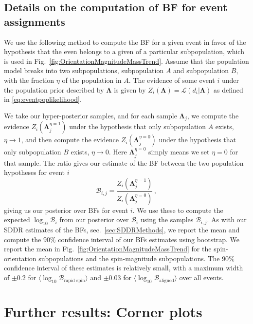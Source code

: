 \documentclass[twocolumn,usenames,dvipsnames,linenumbers]{aastex631}
\begin{document}
\subsection{Details on the computation of BF for event assignments}
\label{sec:Appxeventassignments}
We use the following method to compute the \ac{BF} for a given event in favor of the hypothesis that the even belongs to a given of a particular subpopulation, which is used in Fig.~\ref{fig:OrientationMagnitudeMassTrend}.
Assume that the population model breaks into two subpopulations, subpopulation $A$ and subpopulation $B$, with the fraction $\eta$ of the population in $A$. 
The evidence of some event $i$ under the population prior described by $\boldsymbol{\Lambda}$ is given by $Z_i(\boldsymbol{\Lambda}) = \mathcal{L}(d_i | \boldsymbol{\Lambda})$ as defined in \eqref{eq:eventpoplikelihood}. 

We take our hyper-posterior samples, and for each  sample $
\boldsymbol{\Lambda}_j$, we compute the evidence $Z_i(\boldsymbol{\Lambda}_j^{\eta = 1})$ under the hypothesis that only subpopulation $A$ exists, $\eta \to 1$, and then compute the evidence $Z_i(\boldsymbol{\Lambda}_j^{\eta = 0})$ under the hypothesis that only subpopulation $B$ exists, $\eta \to 0$. 
Here $\boldsymbol{\Lambda}_j^{\eta = 0}$ simply means we set $\eta = 0$ for that sample.
The ratio gives our estimate of the \ac{BF} between the two population hypotheses for event $i$
\begin{equation}
	\mathcal{B}_{i,j} = \frac{Z_i(\boldsymbol{\Lambda}_j^{\eta = 1})}{Z_i(\boldsymbol{\Lambda}_j^{\eta = 0})}\,,
\end{equation} 
giving us our posterior over \acp{BF} for event $i$. 
We use these to compute the expected $\log_{10}\mathcal B_i$ from our posterior over $\mathcal{B}_i$ using the samples $\mathcal B_{i,j}$.
As with our SDDR estimates of the \acp{BF}, sec.~\ref{sec:SDDRMethods}, we report the mean and compute the $90\%$ confidence interval of our \acp{BF} estimates using bootstrap.
 We report the mean  in Fig.~\ref{fig:OrientationMagnitudeMassTrend} for the spin-orientation subpopulations and the spin-magnitude subpopulations.
 The $90\%$ confidence interval of these estimates is relatively small, with a maximum width of $\pm 0.2$ for $\langle \log_{10}\mathcal B_{\text{rapid spin}}\rangle$ and $\pm 0.03$ for $\langle \log_{10}\mathcal B_{\text{aligned}}\rangle$ over all events.


\section{Further results: Corner plots}
\label{sec:ResultsAppx}
\end{document}
